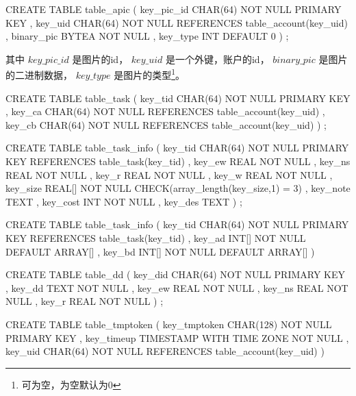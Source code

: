 \begin{sql}[caption=创建账户照片表 table\_apic]
    CREATE TABLE table_apic
        ( key_pic_id CHAR(64) NOT NULL PRIMARY KEY
        , key_uid CHAR(64) NOT NULL REFERENCES table_account(key_uid)
        , binary_pic BYTEA NOT NULL
        , key_type INT DEFAULT 0
        )
    ;
\end{sql}
其中 $key\_pic\_id$ 是图片的id，
$key\_uid$ 是一个外键，账户的id，
$binary\_pic$ 是图片的二进制数据，
$key\_type$ 是图片的类型\footnote{可为空，为空默认为0}。

\begin{sql}[caption=创建任务关联表 table\_task]
    CREATE TABLE table_task
        ( key_tid CHAR(64) NOT NULL PRIMARY KEY
        , key_ca CHAR(64) NOT NULL REFERENCES table_account(key_uid)
        , key_cb CHAR(64) NOT NULL REFERENCES table_account(key_uid)
        )
    ;
\end{sql}

\begin{sql}[caption=创建任务信息表 table\_task\_info]
    CREATE TABLE table_task_info
        ( key_tid CHAR(64) NOT NULL PRIMARY KEY REFERENCES table_task(key_tid)
        , key_ew REAL NOT NULL
        , key_ns REAL NOT NULL
        , key_r REAL NOT NULL
        , key_w REAL NOT NULL
        , key_size REAL[] NOT NULL CHECK(array_length(key_size,1) = 3)
        , key_note TEXT
        , key_cost INT NOT NULL
        , key_des TEXT
        )
    ;
\end{sql}

\begin{sql}[caption=创建任务议价表 table\_task\_cost]
    CREATE TABLE table_task_info
        ( key_tid CHAR(64) NOT NULL PRIMARY KEY REFERENCES table_task(key_tid)
        , key_ad INT[] NOT NULL DEFAULT ARRAY[]
        , key_bd INT[] NOT NULL DEFAULT ARRAY[]
        )
\end{sql}

\begin{sql}[caption=创建可代收表 table\_dd]
    CREATE TABLE table_dd
        ( key_did CHAR(64) NOT NULL PRIMARY KEY
        , key_dd TEXT NOT NULL
        , key_ew REAL NOT NULL
        , key_ns REAL NOT NULL
        , key_r REAL NOT NULL
        )
    ;
\end{sql}

\begin{sql}[caption=创建用户临时Token表 table\_tmptoken]
    CREATE TABLE table_tmptoken
        ( key_tmptoken CHAR(128) NOT NULL PRIMARY KEY
        , key_timeup TIMESTAMP WITH TIME ZONE NOT NULL
        , key_uid CHAR(64) NOT NULL REFERENCES table_account(key_uid)
        )
\end{sql}
